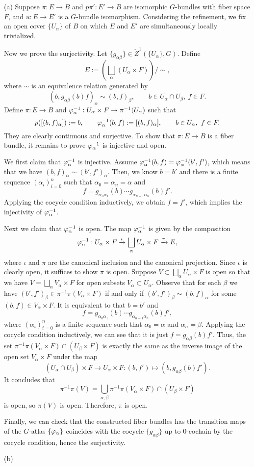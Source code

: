 \documentclass{../../large}
\begin{document}
\begin{pf}
(a)
Suppose $\pi:E\to B$ and $p\pi':E'\to B$ are isomorphic $G$-bundles with fiber space $F$, and $u:E\to E'$ is a $G$-bundle isomorphism.
Considering the refinement, we fix an open cover $\{U_\alpha\}$ of $B$ on which $E$ and $E'$ are simultaneously locally trivialized.

Now we prove the surjectivity.
Let $\{g_{\alpha\beta}\}\in\check Z^1(\{U_\alpha\},G)$.
Define
\[E:=\left(\bigsqcup_\alpha(U_\alpha\times F)\right)/\sim,\]
where $\sim$ is an equivalence relation generated by
\[(b,g_{\alpha\beta}(b)f)_\alpha\sim(b,f)_\beta,
\qquad b\in U_\alpha\cap U_\beta,\ f\in F.\]
Define $\pi:E\to B$ and $\varphi_\alpha^{-1}:U_\alpha\times F\to\pi^{-1}(U_\alpha)$ such that
\[p([(b,f)_\alpha]):=b,\qquad\varphi_\alpha^{-1}(b,f):=[(b,f)_\alpha],\qquad b\in U_\alpha,\ f\in F.\]
They are clearly continuous and surjective.
To show that $\pi:E\to B$ is a fiber bundle, it remains to prove $\varphi_\alpha^{-1}$ is injective and open.

We first claim that $\varphi_\alpha^{-1}$ is injective.
Assume $\varphi_\alpha^{-1}(b,f)=\varphi_\alpha^{-1}(b',f')$, which means that we have $(b,f)_\alpha\sim(b',f')_\alpha$.
Then, we know $b=b'$ and there is a finite sequence $(\alpha_i)_{i=0}^n$ such that $\alpha_0=\alpha_n=\alpha$ and
\[f=g_{\alpha_0\alpha_1}(b)\cdots g_{\alpha_{n-1}\alpha_n}(b)f'.\]
Applying the cocycle condition inductively, we obtain $f=f'$, which implies the injectivity of $\varphi_\alpha^{-1}$.

Next we claim that $\varphi_\alpha^{-1}$ is open.
The map $\varphi_\alpha^{-1}$ is given by the composition
\[\varphi_\alpha^{-1}:U_\alpha\times F\xrightarrow{\iota}\bigsqcup_\alpha U_\alpha\times F\xrightarrow{\pi}E,\]
where $\iota$ and $\pi$ are the canonical inclusion and the canonical projection.
Since $\iota$ is clearly open, it suffices to show $\pi$ is open.
Suppose $V\subset\bigsqcup_\alpha U_\alpha\times F$ is open so that we have $V=\bigsqcup_\alpha V_\alpha\times F$ for open subsets $V_\alpha\subset U_\alpha$.
Observe that for each $\beta$ we have $(b',f')_\beta\in\pi^{-1}\pi(V_\alpha\times F)$ if and only if $(b',f')_\beta\sim(b,f)_\alpha$ for some $(b,f)\in V_\alpha\times F$.
It is equivalent to that $b=b'$ and 
\[f=g_{\alpha_0\alpha_1}(b)\cdots g_{\alpha_{n-1}\alpha_n}(b)f',\]
where $(\alpha_i)_{i=0}^n$ is a finite sequence such that $\alpha_0=\alpha$ and $\alpha_n=\beta$.
Applying the cocycle condition inductively, we can see that it is just $f=g_{\alpha\beta}(b)f'$.
Thus, the set $\pi^{-1}\pi(V_\alpha\times F)\cap(U_\beta\times F)$ is exactly the same as the inverse image of the open set $V_\alpha\times F$ under the map
\[(U_\alpha\cap U_\beta)\times F\to U_\alpha\times F:(b,f')\mapsto(b,g_{\alpha\beta}(b)f').\]
It concludes that
\[\pi^{-1}\pi(V)=\bigcup_{\alpha,\beta}\pi^{-1}\pi(V_\alpha\times F)\cap(U_\beta\times F)\]
is open, so $\pi(V)$ is open.
Therefore, $\pi$ is open.

Finally, we can check that the constructed fiber bundles has the transition maps of the $G$-atlas $\{\varphi_\alpha\}$ coincides with the cocycle $\{g_{\alpha\beta}\}$ up to 0-cochain by the cocycle condition, hence the surjectivity.

(b)
\end{pf}
\end{document}
